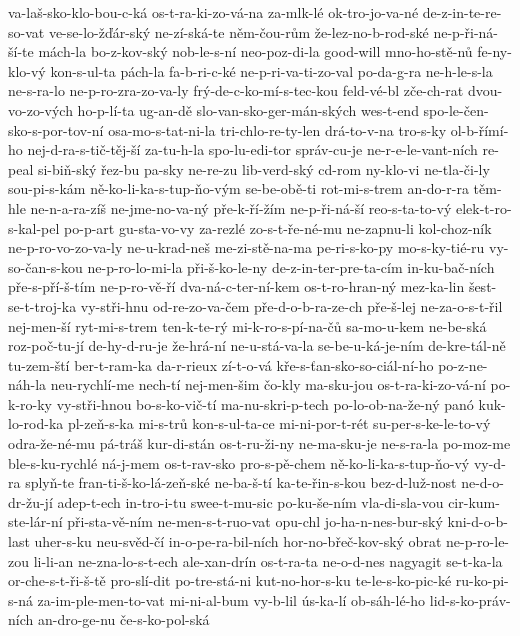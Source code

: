 {va-laš-sko-klo-bou-c-ká
os-t-ra-ki-zo-vá-na
za-mlk-lé
ok-tro-jo-va-né
de-z-in-te-re-so-vat
ve-se-lo-žďár-ský
ne-zí-ská-te
něm-čou-rům
že-lez-no-b-rod-ské
ne-p-ři-ná-ší-te
mách-la
bo-z-kov-ský
nob-le-s-ní
neo-poz-di-la
good-will
mno-ho-stě-nů
fe-ny-klo-vý
kon-s-ul-ta
pách-la
fa-b-ri-c-ké
ne-p-ri-va-ti-zo-val
po-da-g-ra
ne-h-le-s-la
ne-s-ra-lo
ne-p-ro-zra-zo-va-ly
frý-de-c-ko-mí-s-tec-kou
feld-vé-bl
zče-ch-rat
dvou-vo-zo-vých
ho-p-lí-ta
ug-an-dě
slo-van-sko-ger-mán-ských
wes-t-end
spo-le-čen-sko-s-por-tov-ní
osa-mo-s-tat-ni-la
tri-chlo-re-ty-len
drá-to-v-na
tro-s-ky
ol-b-římí-ho
nej-d-ra-s-tič-těj-ší
za-tu-h-la
spo-lu-edi-tor
správ-cu-je
ne-r-e-le-vant-ních
re-peal
si-biň-ský
řez-bu
pa-sky
ne-re-zu
lib-verd-ský
cd-rom
ny-klo-vi
ne-tla-či-ly
sou-pi-s-kám
ně-ko-li-ka-s-tup-ňo-vým
se-be-obě-ti
rot-mi-s-trem
an-do-r-ra
těm-hle
ne-n-a-ra-zíš
ne-jme-no-va-ný
pře-k-ří-žím
ne-p-ři-ná-ší
reo-s-ta-to-vý
elek-t-ro-s-kal-pel
po-p-art
gu-sta-vo-vy
za-rezlé
zo-s-t-ře-né-mu
ne-zapnu-li
kol-choz-ník
ne-p-ro-vo-zo-va-ly
ne-u-krad-neš
me-zi-stě-na-ma
pe-ri-s-ko-py
mo-s-ky-tié-ru
vy-so-čan-s-kou
ne-p-ro-lo-mi-la
při-š-ko-le-ny
de-z-in-ter-pre-ta-cím
in-ku-bač-ních
pře-s-pří-š-tím
ne-p-ro-vě-ří
dva-ná-c-ter-ní-kem
os-t-ro-hran-ný
mez-ka-lin
šest-se-t-troj-ka
vy-stři-hnu
od-re-zo-va-čem
pře-d-o-b-ra-ze-ch
pře-š-lej
ne-za-o-s-t-řil
nej-men-ší
ryt-mi-s-trem
ten-k-te-rý
mi-k-ro-s-pí-na-čů
sa-mo-u-kem
ne-be-ská
roz-poč-tu-jí
de-hy-d-ru-je
že-hrá-ní
ne-u-stá-va-la
se-be-u-ká-je-ním
de-kre-tál-ně
tu-zem-ští
ber-t-ram-ka
da-r-rieux
zí-t-o-vá
kře-s-ťan-sko-so-ciál-ní-ho
po-z-ne-náh-la
neu-rychlí-me
nech-tí
nej-men-šim
čo-kly
ma-sku-jou
os-t-ra-ki-zo-vá-ní
po-k-ro-ky
vy-stři-hnou
bo-s-ko-vič-tí
ma-nu-skri-p-tech
po-lo-ob-na-že-ný
panó
kuk-lo-rod-ka
pl-zeň-s-ka
mi-s-trů
kon-s-ul-ta-ce
mi-ni-por-t-rét
su-per-s-ke-le-to-vý
odra-že-né-mu
pá-tráš
kur-di-stán
os-t-ru-ži-ny
ne-ma-sku-je
ne-s-ra-la
po-moz-me
ble-s-ku-rychlé
ná-j-mem
os-t-rav-sko
pro-s-pě-chem
ně-ko-li-ka-s-tup-ňo-vý
vy-d-ra
splyň-te
fran-ti-š-ko-lá-zeň-ské
ne-ba-š-tí
ka-te-řin-s-kou
bez-d-luž-nost
ne-d-o-dr-žu-jí
adep-t-ech
in-tro-i-tu
swee-t-mu-sic
po-ku-še-ním
vla-di-sla-vou
cir-kum-ste-lár-ní
při-sta-vě-ním
ne-men-s-t-ruo-vat
opu-chl
jo-ha-n-nes-bur-ský
kni-d-o-b-last
uher-s-ku
neu-svěd-čí
in-o-pe-ra-bil-ních
hor-no-břeč-kov-ský
obrat
ne-p-ro-le-zou
li-li-an
ne-zna-lo-s-t-ech
ale-xan-drín
os-t-ra-ta
ne-o-d-nes
nagyagit
se-t-ka-la
or-che-s-t-ři-š-tě
pro-slí-dit
po-tre-stá-ni
kut-no-hor-s-ku
te-le-s-ko-pic-ké
ru-ko-pi-s-ná
za-im-ple-men-to-vat
mi-ni-al-bum
vy-b-lil
ús-ka-lí
ob-sáh-lé-ho
lid-s-ko-práv-ních
an-dro-ge-nu
če-s-ko-pol-ská
}
